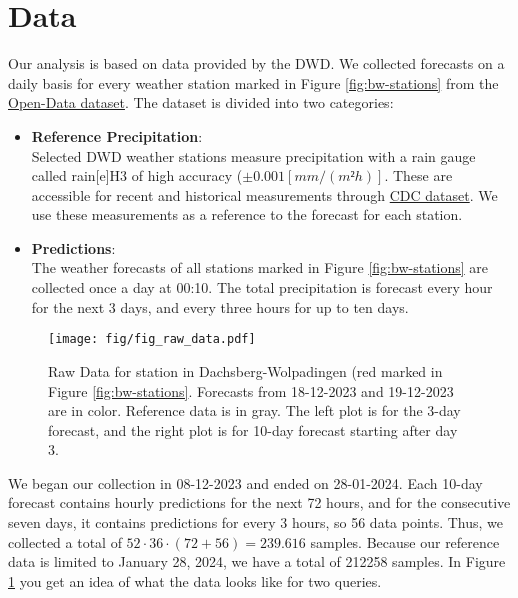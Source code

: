 \documentclass{article}
\theoremstyle{plain}
\theoremstyle{definition}
\theoremstyle{remark}
\begin{document}
\section{Data}\label{sec:Data}
Our analysis is based on data provided by the DWD. We collected forecasts on a
daily basis for every weather station marked in Figure \ref{fig:bw-stations}
from the \href{https://opendata.dwd.de/climate_environment/CDC/}{Open-Data
    dataset}. The dataset is divided into two categories:
\begin{itemize}
    \item \textbf{Reference Precipitation}:\\
          Selected DWD weather stations measure precipitation with a rain gauge
          called rain[e]H3 \cite{rain-e} of high accuracy ($\pm 0.001 [mm/(m²h)]$. These
          are accessible for recent and historical measurements through
          \href{https://opendata.dwd.de/climate_environment/CDC/observations_germany/climate/hourly/precipitation/}{CDC
              dataset}. We use these measurements as a reference to the forecast for each
          station.

    \item \textbf{Predictions}:\\
          The weather forecasts of all stations marked in Figure
          \ref{fig:bw-stations} are collected once a day at 00:10. The total
          precipitation is forecast every hour for the next 3 days, and every three hours
          for up to ten days.
\end{itemize}
\begin{figure}
    \centering
    \texttt{[image: fig/fig\_raw\_data.pdf]}
    \caption{Raw Data for station in Dachsberg-Wolpadingen (red marked in
        Figure \ref{fig:bw-stations}. Forecasts from 18-12-2023 and 19-12-2023 are in
        color. Reference data is in gray. The left plot is for the 3-day forecast, and
        the right plot is for 10-day forecast starting after day 3. }
    \label{fig:dec_diff_call_times}
\end{figure}
We began our collection in 08-12-2023 and ended on 28-01-2024.
Each 10-day forecast contains hourly predictions for the next 72 hours, and for
the consecutive seven days, it contains predictions for every 3 hours, so 56
data points.
Thus, we collected a total of $52 \cdot 36 \cdot (72 + 56) = 239.616$ samples.
Because our reference data is limited to January 28, 2024, we have a total of
212258 samples.
In Figure \ref{fig:dec_diff_call_times} you get an idea of what the data looks
like for two queries.
\end{document}
